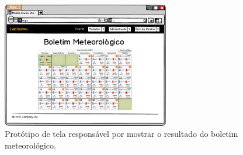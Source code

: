 \begin{figure}[H]
	\centering
	\includegraphics[width=0.65\textwidth]{./img/telas/tela077.png}
	\caption{Protótipo de tela responsável por mostrar o resultado do boletim meteorológico.} \label{fig:tela077}
\end{figure}
